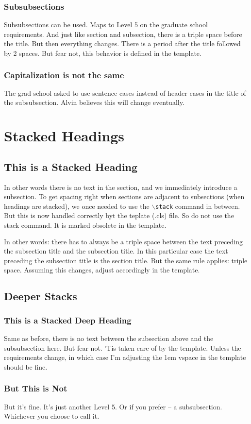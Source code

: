 \lipsum[1]

\subsubsection{Subsubsections}
Subsubsections can be used. Maps to Level 5 on the graduate school requirements.
And just like section and subsection, there is a triple space before the title.
But then everything changes.
There is a period after the title followed by 2 spaces.
But fear not, this behavior is defined in the template.

\subsubsection{Capitalization is not the same}
The grad school asked to use sentence cases instead of header cases in the title of the subsubsection.
Alvin believes this will change eventually.

\section{Stacked Headings}


\subsection{This is a Stacked Heading}
In other words there is no text in the section, and we immediately introduce a subsection.
To get spacing right when sections are adjacent to subsections (when headings are stacked),
we once needed to use the \texttt{$\backslash$stack} command in between.
But this is now handled correctly byt the teplate (.cls) file. So do not use the stack command.
It is marked obsolete in the template.

In other words: there has to always be a triple space between the text preceding the subsection title and the subsection title.
In this particular case the text preceding the subsection title is the section title.
But the same rule applies: triple space.
Assuming this changes, adjust accordingly in the template.

\subsection{Deeper Stacks}


\subsubsection{This is a Stacked Deep Heading}
Same as before, there is no text between the subsection above and the subsubsection here.
But fear not. 'Tis taken care of by the template.
Unless the requirements change, in which case I'm adjusting the 1em vspace in the template should be fine.

\subsubsection{But This is Not}
But it's fine. It's just another Level 5. Or if you prefer -- a subsubsection. Whichever you choose to call it.
